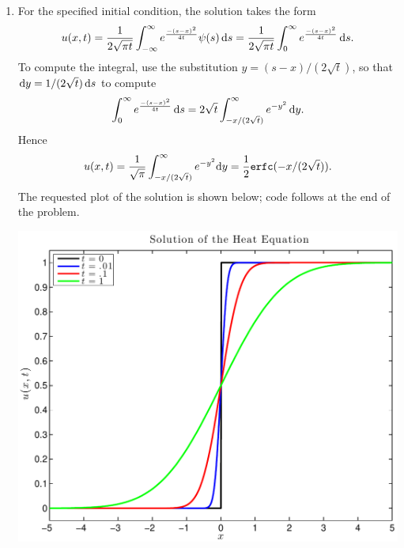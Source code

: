 {\begin{solution}
\begin{enumerate}
\item For the specified initial condition, the solution takes the form
       \[ u(x,t) = {1\over 2\sqrt{\pi t}} 
                  \int_{-\infty}^\infty e^{-(s-x)^2\over 4t} \psi(s)\, {\rm d} s
                 = {1\over 2\sqrt{\pi t}} 
                  \int_{0}^\infty e^{-(s-x)^2\over 4t} \, {\rm d} s.\]
      To compute the integral, use the substitution $y = (s-x)/(2\sqrt{t})$, so that
      ${\rm d} y = 1/(2 \sqrt{t})\,{\rm d} s$ to compute
       \[ \int_{0}^\infty e^{-(s-x)^2\over 4t} \, {\rm d} s
          =2\sqrt{t} \int_{-x/(2\sqrt{t})}^\infty e^{-y^2} \, {\rm d} y.\]
      Hence
       \[ u(x,t) = {1\over \sqrt{\pi}} \int_{-x/(2\sqrt{t})}^\infty e^{-y^2} {\rm d} y
                 = {1\over 2} {\tt erfc}(-x/(2\sqrt{t})).\]
       The requested plot of the solution is shown below; code follows at the end of the problem.
       \begin{center}\includegraphics[scale=0.7]{heat_v_wave2}\end{center}
\end{enumerate}


\end{solution}}{}


